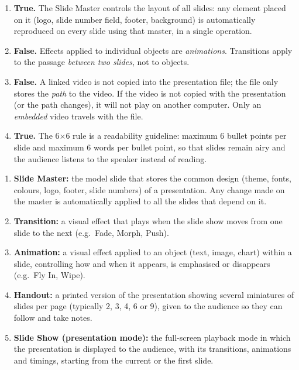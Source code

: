 \documentclass[11pt]{article}
\begin{document}
\begin{corrige}
\begin{enumerate}
\item \textbf{True.} The Slide Master controls the layout of all slides: any element placed on it (logo, slide number field, footer, background) is automatically reproduced on every slide using that master, in a single operation.
\item \textbf{False.} Effects applied to individual objects are \emph{animations}. Transitions apply to the passage \emph{between two slides}, not to objects.
\item \textbf{False.} A linked video is not copied into the presentation file; the file only stores the \emph{path} to the video. If the video is not copied with the presentation (or the path changes), it will not play on another computer. Only an \emph{embedded} video travels with the file.
\item \textbf{True.} The 6$\times$6 rule is a readability guideline: maximum 6 bullet points per slide and maximum 6 words per bullet point, so that slides remain airy and the audience listens to the speaker instead of reading.
\end{enumerate}
\end{corrige}

\begin{corrige}
\begin{enumerate}
\item \textbf{Slide Master:} the model slide that stores the common design (theme, fonts, colours, logo, footer, slide numbers) of a presentation. Any change made on the master is automatically applied to all the slides that depend on it.
\item \textbf{Transition:} a visual effect that plays when the slide show moves from one slide to the next (e.g.\ Fade, Morph, Push).
\item \textbf{Animation:} a visual effect applied to an object (text, image, chart) within a slide, controlling how and when it appears, is emphasised or disappears (e.g.\ Fly In, Wipe).
\item \textbf{Handout:} a printed version of the presentation showing several miniatures of slides per page (typically 2, 3, 4, 6 or 9), given to the audience so they can follow and take notes.
\item \textbf{Slide Show (presentation mode):} the full-screen playback mode in which the presentation is displayed to the audience, with its transitions, animations and timings, starting from the current or the first slide.
\end{enumerate}
\end{corrige}
\end{document}
